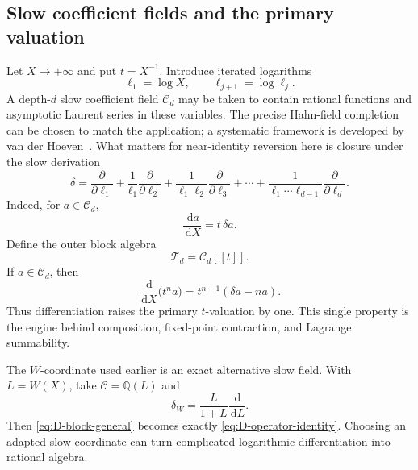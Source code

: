 \documentclass[11pt,a4paper]{article}
\numberwithin{equation}{section}
\theoremstyle{definition}
\theoremstyle{remark}
\newcommand{\dd}{\,\mathrm d}
\newcommand{\Tfield}{\mathscr T}
\newcommand{\Cfield}{\mathscr C}
\begin{document}
\subsection{Slow coefficient fields and the primary valuation}

Let \(X\to+\infty\) and put \(t=X^{-1}\).  Introduce iterated logarithms
\begin{equation}\label{eq:iterated-logs}
  \ell_1=\log X,
  \qquad \ell_{j+1}=\log\ell_j.
\end{equation}
A depth-\(d\) slow coefficient field \(\Cfield_d\) may be taken to contain
rational functions and asymptotic Laurent series in these variables.  The
precise Hahn-field completion can be chosen to match the application; a
systematic framework is developed by van der Hoeven~\cite{vanDerHoeven}.
What matters for near-identity reversion here is closure under the slow
derivation
\begin{equation}\label{eq:slow-delta}
 \delta=
 \frac{\partial}{\partial\ell_1}
 +\frac1{\ell_1}\frac{\partial}{\partial\ell_2}
 +\frac1{\ell_1\ell_2}\frac{\partial}{\partial\ell_3}
 +\cdots
 +\frac1{\ell_1\cdots\ell_{d-1}}
  \frac{\partial}{\partial\ell_d}.
\end{equation}
Indeed, for \(a\in\Cfield_d\),
\begin{equation}\label{eq:D-slow}
  \frac{\dd a}{\dd X}=t\,\delta a.
\end{equation}
Define the outer block algebra
\begin{equation}\label{eq:Tfield-def}
  \Tfield_d=\Cfield_d[[t]].
\end{equation}
If \(a\in\Cfield_d\), then
\begin{equation}\label{eq:D-block-general}
  \frac{\dd}{\dd X}\bigl(t^na\bigr)
  =t^{n+1}(\delta a-na).
\end{equation}
Thus differentiation raises the primary \(t\)-valuation by one.  This
single property is the engine behind composition, fixed-point contraction,
and Lagrange summability.

The \(W\)-coordinate used earlier is an exact alternative slow field.  With
\(L=W(X)\), take \(\Cfield=\mathbb Q(L)\) and
\begin{equation}\label{eq:delta-W-field}
  \delta_W=\frac{L}{1+L}\frac{\dd}{\dd L}.
\end{equation}
Then \eqref{eq:D-block-general} becomes exactly
\eqref{eq:D-operator-identity}.  Choosing an adapted slow coordinate can
turn complicated logarithmic differentiation into rational algebra.
\end{document}
